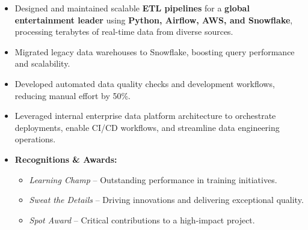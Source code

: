 \begin{itemize}[leftmargin=0.5cm]

    \item Designed and maintained scalable \textbf{ETL pipelines} for a \textbf{global entertainment leader} using \textbf{Python, Airflow, AWS, and Snowflake}, processing terabytes of real-time data from diverse sources.
    \item Migrated legacy data warehouses to Snowflake, boosting query performance and scalability.
    \item Developed automated data quality checks and development workflows, reducing manual effort by 50\%.
    \item Leveraged internal enterprise data platform architecture to orchestrate deployments, enable CI/CD workflows, and streamline data engineering operations.
    
    \item \textbf{Recognitions \& Awards:}
    \begin{itemize}[leftmargin=0.5cm]
        \item \textit{Learning Champ} – Outstanding performance in training initiatives.
        \item \textit{Sweat the Details} – Driving innovations and delivering exceptional quality.
        \item \textit{Spot Award} – Critical contributions to a high-impact project.
    \end{itemize}

\end{itemize}



